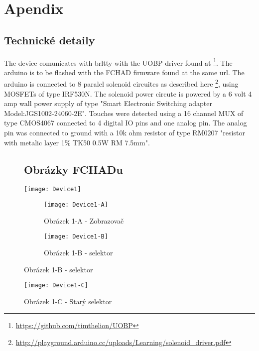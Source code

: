 \appendix
{}
\thispagestyle{empty}  
\renewcommand{\appendixname}{Apendix}%


\chapter{Apendix}

\section{Technické detaily}

The device comunicates with brltty with the UOBP driver found at \footnote{\url{https://github.com/timthelion/UOBP}}.  The arduino is to be flashed with the FCHAD firmware found at the same url.  The arduino is connected to 8 paralel solenoid circuites as described here \footnote{\url{http://playground.arduino.cc/uploads/Learning/solenoid_driver.pdf}}, using MOSFETs of type IRF530N.  The solenoid power circute is powered by a 6 volt 4 amp wall power supply of type "Smart Electronic Switching adapter Model:JGS1002-24060-2E".  Touches were detected using a 16 channel MUX of type CMOS4067 connected to 4 digital IO pins and one analog pin.  The analog pin was connected to ground with a 10k ohm resistor of type RM0207 "resistor with metalic layer 1\% TK50 0.5W RM 7.5mm".


\clearpage
\begin{figure}
\section{Obrázky FCHADu}
\texttt{[image: Device1]}
\begin{subfigure}{.5\textwidth}
  \centering
  \texttt{[image: Device1-A]}
  \caption{Obrázek 1-A - Zobrazovač}
  \label{fig:sub1}
\end{subfigure}%
\begin{subfigure}{.5\textwidth}
  \centering
  \texttt{[image: Device1-B]}
  \caption{Obrázek 1-B - selektor}
  \label{fig:sub2}
\end{subfigure}

\label{fig:test}
\end{figure}
\begin{figure}
\texttt{[image: Device1-C]}
\caption{Obrázek 1-C - Starý selektor}
\label{fig:sub2}
\end{figure}

